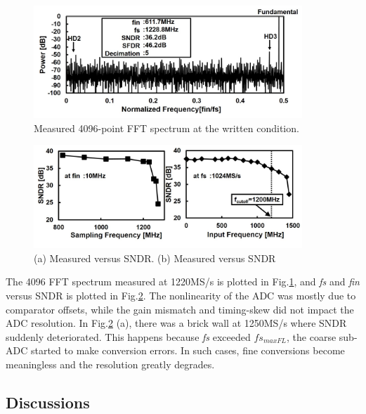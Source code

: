\begin{figure}
\centering
  \includegraphics[width=0.9\textwidth]{figure/chap3/fig18.jpg}
  \caption{Measured 4096-point FFT spectrum at the written condition.}
  \label{fig-3-18}
\end{figure}
\begin{figure}
\centering
  \includegraphics[width=0.9\textwidth]{figure/chap3/fig19.jpg}
  \caption{(a) Measured versus SNDR. (b) Measured versus SNDR}
  \label{fig-3-19}
\end{figure}

The 4096 FFT spectrum measured at 1220MS/s is plotted in Fig.\ref{fig-3-18}, and \textit{fs} and \textit{fin} versus SNDR is plotted in Fig.\ref{fig-3-19}. The nonlinearity of the ADC was mostly due to comparator offsets, while the gain mismatch and timing-skew did not impact the ADC resolution. In Fig.\ref{fig-3-19} (a), there was a brick wall at 1250MS/s where SNDR suddenly deteriorated. This happens because \textit{fs} exceeded $fs_{maxFL}$, the coarse sub-ADC started to make conversion errors. In such cases, fine conversions become meaningless and the resolution greatly degrades.  

\subsection{Discussions}

